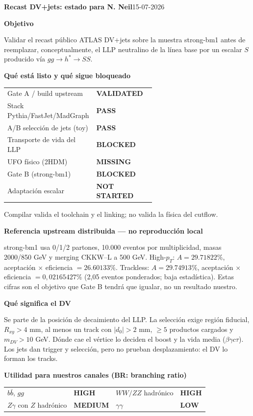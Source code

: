 \documentclass[9pt,a4paper]{article}
\newcommand{\head}[1]{\vspace{0.35em}\textbf{\large #1}\par\vspace{0.1em}}
\begin{document}
{\LARGE\bfseries Recast DV+jets: estado para N. Neil}\hfill 15-07-2026

\head{Objetivo}
Validar el recast público ATLAS DV+jets sobre la muestra strong-bm1 antes de reemplazar, conceptualmente, el LLP neutralino de la línea base por un escalar $S$ producido vía $gg\to h^*\to SS$.

\head{Qué está listo y qué sigue bloqueado}
\begin{tabular}{p{0.60\linewidth}l}
\toprule
Gate A / build upstream & \textcolor{ok}{\textbf{VALIDATED}}\\
Stack Pythia/FastJet/MadGraph & \textcolor{ok}{\textbf{PASS}}\\
A/B selección de jets (toy) & \textcolor{ok}{\textbf{PASS}}\\
Transporte de vida del LLP & \textcolor{stop}{\textbf{BLOCKED}}\\
UFO físico (2HDM) & \textcolor{stop}{\textbf{MISSING}}\\
Gate B (strong-bm1) & \textcolor{stop}{\textbf{BLOCKED}}\\
Adaptación escalar & \textbf{NOT STARTED}\\
\bottomrule
\end{tabular}

Compilar valida el toolchain y el linking; no valida la física del cutflow.

\head{Referencia upstream distribuida --- no reproducción local}
strong-bm1 usa 0/1/2 partones, 10.000 eventos por multiplicidad, masas 2000/850 GeV y merging CKKW--L a 500 GeV. High-$p_T$: $A=29.71822\%$, aceptación $\times$ eficiencia $=26.60133\%$. Trackless: $A=29.74913\%$, aceptación $\times$ eficiencia $=0{,}02165427\%$ (2,05 eventos ponderados; baja estadística). Estas cifras son el objetivo que Gate B tendrá que igualar, no un resultado nuestro.

\head{Qué significa el DV}
Se parte de la posición de decaimiento del LLP. La selección exige región fiducial, $R_{xy}>4$ mm, al menos un track con $|d_0|>2$ mm, $\geq5$ productos cargados y $m_{DV}>10$ GeV. Dónde cae el vértice lo deciden el boost y la vida media ($\beta\gamma c\tau$). Los jets dan trigger y selección, pero no prueban desplazamiento: el DV lo forman los tracks.

\head{Utilidad para nuestros canales (BR: branching ratio)}
\begin{tabular}{llll}
\toprule
$b\bar b$, $gg$ & \textbf{HIGH} & $WW/ZZ$ hadrónico & \textbf{HIGH}\\
$Z\gamma$ con $Z$ hadrónico & \textbf{MEDIUM} & $\gamma\gamma$ & \textbf{LOW}\\
\bottomrule
\end{tabular}
\end{document}

